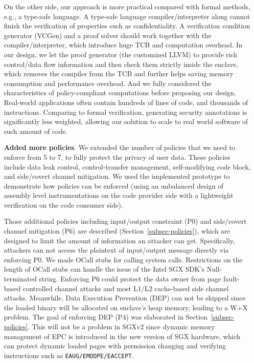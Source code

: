 On the other side, our approach is more practical compared with formal methods, e.g., a type-safe language. A type-safe language compiler/interpreter along cannot finish the verification of properties such as confidentiality.  A verification condition generator (VCGen) and a proof solver should work together with the compiler/interpreter, which introduce huge TCB and computation overhead.
In our design, we let the proof generator (the customized LLVM) to provide rich control/data flow information and then check them strictly inside the enclave, which removes the compiler from the TCB and further helps saving memory consumption and performance overhead. And we fully considered the characteristics of policy-compliant computations before proposing our design. Real-world applications often contain hundreds of lines of code, and thousands of instructions. Comparing to formal verification, generating security annotations is significantly less weighted, allowing our solution to scale to real world software of such amount of code.


\vspace{3pt}\noindent\textbf{Added more policies}. We extended the number of policies that we need to enforce from 5 to 7, to fully protect the privacy of user data. These policies include data leak control, control-transfer management, self-modifying code block, and side/covert channel mitigation. We used the implemented prototype to demonstrate how policies can be enforced (using an unbalanced design of assembly level instrumentations on the code provider side with a lightweight verification on the code consumer side). 

Those additional policies including input/output constraint (P0) and side/covert channel mitigation (P6) are described (Section~\ref{subsec-policies}), which are designed to limit the amount of information an attacker can get. Specifically, attackers can not access the plaintext of input/output message directly via enforcing P0. We made OCall stubs for calling system calls. Restrictions on the length of OCall stubs can handle the issue of the Intel SGX SDK's Null-terminated string.
Enforcing P6 could protect the data owner from page fault-based controlled channel attacks and most L1/L2 cache-based side channel attacks. 
Meanwhile, Data Execution Prevention (DEP) can not be skipped since the loaded binary will be allocated on enclave's heap memory, leading to a W+X problem. The goal of enforcing DEP (P4) was elaborated in Section~\ref{subsec-policies}. This will not be a problem in SGXv2 since dynamic memory management of EPC is introduced in the new version of SGX hardware, which can protect dynamic loaded pages with permission changing and verifying instructions such as \texttt{EAUG/EMODPE/EACCEPT}.


